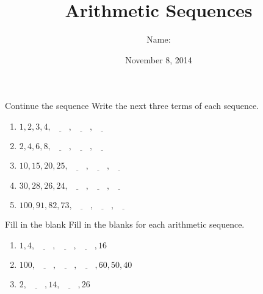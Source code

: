 \documentclass[12pt,letterpaper]{article}
\title{Arithmetic Sequences}
\author{Name: \underline{\hspace{5cm}}}
\date{November 8, 2014}
\begin{document}
\maketitle

\thispagestyle{empty}

\begin{problem}{Continue the sequence}
 Write the next three terms of each sequence.

\begin{enumerate}[\hspace{.5cm}a.]
\item $1, 2, 3, 4, \underline{\hspace{2em}}, \underline{\hspace{2em}}, \underline{\hspace{2em}}$
\item $2, 4, 6, 8, \underline{\hspace{2em}}, \underline{\hspace{2em}}, \underline{\hspace{2em}}$
\item $10, 15, 20, 25, \underline{\hspace{2em}}, \underline{\hspace{2em}}, \underline{\hspace{2em}}$
\item $30, 28, 26, 24, \underline{\hspace{2em}}, \underline{\hspace{2em}}, \underline{\hspace{2em}}$
\item $100, 91, 82, 73, \underline{\hspace{2em}}, \underline{\hspace{2em}}, \underline{\hspace{2em}}$
\end{enumerate}
\end{problem}

\begin{problem}{Fill in the blank}
 Fill in the blanks for each arithmetic sequence.

\begin{enumerate}[\hspace{.5cm}a.]
\item $1, 4, \underline{\hspace{2em}}, \underline{\hspace{2em}}, \underline{\hspace{2em}}, 16$
\item $100, \underline{\hspace{2em}}, \underline{\hspace{2em}}, \underline{\hspace{2em}}, 60, 50, 40$
\item $2, \underline{\hspace{2em}}, 14, \underline{\hspace{2em}}, 26$
\end{enumerate}
\end{problem}
\end{document}
